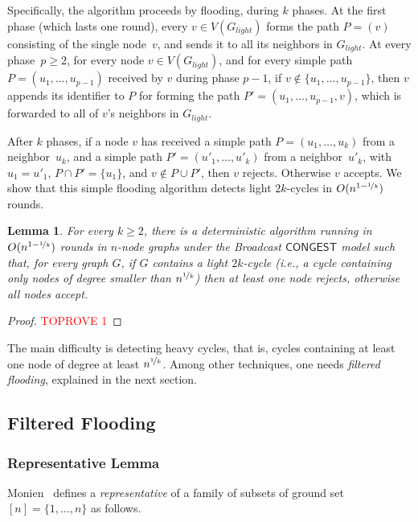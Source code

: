 \documentclass{article}
\newcommand{\CONGEST}{\textsf{CONGEST}}
\newtheorem{lemma}{Lemma}
\begin{document}
Specifically, the algorithm proceeds by flooding, during $k$ phases. At the first phase (which lasts one round), every $v\in V(G_{light})$ forms the path $P=(v)$ consisting of the single node~$v$, and sends it to all its neighbors in $G_{light}$. At every phase~$p\geq 2$, for every node $v \in V(G_{light})$, and for every simple path $P=(u_1,\dots,u_{p-1})$ received by $v$ during phase $p-1$, if $v\notin \{u_1,\dots,u_{p-1}\}$, then $v$ appends its identifier to $P$ for forming the path $P'=(u_1,\dots,u_{p-1},v)$, which is forwarded to all of $v$'s neighbors in $G_{light}$. 

After $k$ phases, if a node $v$ has received a simple path $P=(u_1,\dots,u_k)$ from a neighbor~$u_k$, and a simple path $P'=(u'_1,\dots,u'_k)$ from a neighbor~$u'_k$, with $u_1=u'_1$, $P\cap P'=\{u_1\}$, and $v\notin P\cup P'$, then $v$ rejects. Otherwise $v$ accepts. We show that this simple flooding algorithm detects light $2k$-cycles in $O(n^{1-\nicefrac{1}{k}})$ rounds. 

\begin{lemma}\label{lem:complexity-light-cycles}
    For every $k\geq 2$, there is a deterministic algorithm running in $O(n^{1-\nicefrac{1}{k}})$ rounds in $n$-node graphs under the Broadcast $\CONGEST$ model  such that, for every graph $G$, if $G$ contains a \emph{light} $2k$-cycle (i.e., a cycle containing only nodes of degree smaller than $n^{\nicefrac{1}{k}}$) then at least one node rejects, otherwise all nodes accept.   
\end{lemma}

\begin{proof}\textcolor{red}{TOPROVE 1}\end{proof}

The main difficulty is detecting heavy cycles, that is, cycles containing at least one node of degree at least $n^{\nicefrac{1}{k}}$. Among other techniques, one needs \emph{filtered flooding}, explained in the next section.  

\subsection{Filtered Flooding}


\subsubsection{Representative Lemma} 

Monien~\cite{monien85} defines a \emph{representative} of a family of subsets of ground set $[n]=\{1,\dots,n\}$ as follows. 
\end{document}
